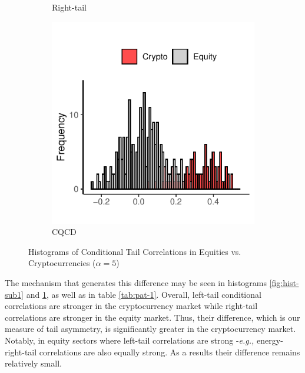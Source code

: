 \documentclass{article}
\begin{document}
\begin{figure}[H]
\begin{subfigure}{.33\textwidth}
  \caption{Right-tail}
  \label{fig:hist-sub2}
\end{subfigure}%
\begin{subfigure}{.33\textwidth}
  \centering
  \includegraphics[width=\linewidth]{Figures/hist_d.pdf}
  \caption{CQCD}
  \label{fig:hist-sub3}
\end{subfigure}
\caption{Histograms of Conditional Tail Correlations in Equities vs. Cryptocurrencies ($\alpha = 5$)}
\label{fig:hist}
\end{figure}

 
The mechanism that generates this difference may be seen in histograms \ref{fig:hist-sub1} and \ref{fig:hist-sub2}, as well as in table \ref{tab:pat-1}. Overall, left-tail conditional correlations are stronger in the cryptocurrency market while right-tail correlations are stronger in the equity market. Thus, their difference, which is our measure of tail asymmetry, is significantly greater in the cryptocurrency market. Notably, in equity sectors where left-tail correlations are strong -\textit{e.g.,} energy- right-tail correlations are also equally strong. As a results their difference remains relatively small.
 
 
\end{document}

